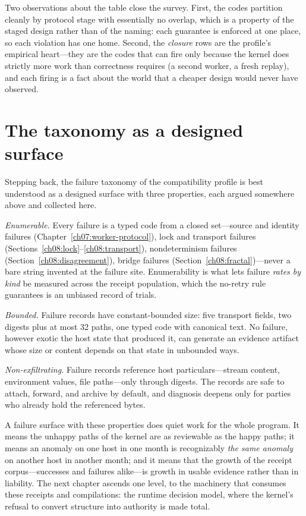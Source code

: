 Two observations about the table close the survey. First, the codes partition cleanly by protocol stage with essentially no overlap, which is a property of the staged design rather than of the naming: each guarantee is enforced at one place, so each violation has one home. Second, the \emph{closure} rows are the profile's empirical heart---they are the codes that can fire only because the kernel does strictly more work than correctness requires (a second worker, a fresh replay), and each firing is a fact about the world that a cheaper design would never have observed.

\section{The taxonomy as a designed surface}\label{ch08:taxonomy}

Stepping back, the failure taxonomy of the compatibility profile is best understood as a designed surface with three properties, each argued somewhere above and collected here.

\emph{Enumerable.} Every failure is a typed code from a closed set---source and identity failures (Chapter~\ref{ch07:worker-protocol}), lock and transport failures (Sections~\ref{ch08:lock}--\ref{ch08:transport}), nondeterminism failures (Section~\ref{ch08:disagreement}), bridge failures (Section~\ref{ch08:fractal})---never a bare string invented at the failure site. Enumerability is what lets failure \emph{rates by kind} be measured across the receipt population, which the no-retry rule guarantees is an unbiased record of trials.

\emph{Bounded.} Failure records have constant-bounded size: five transport fields, two digests plus at most 32 paths, one typed code with canonical text. No failure, however exotic the host state that produced it, can generate an evidence artifact whose size or content depends on that state in unbounded ways.

\emph{Non-exfiltrating.} Failure records reference host particulars---stream content, environment values, file paths---only through digests. The records are safe to attach, forward, and archive by default, and diagnosis deepens only for parties who already hold the referenced bytes.

A failure surface with these properties does quiet work for the whole program. It means the unhappy paths of the kernel are as reviewable as the happy paths; it means an anomaly on one host in one month is recognizably \emph{the same anomaly} on another host in another month; and it means that the growth of the receipt corpus---successes and failures alike---is growth in usable evidence rather than in liability. The next chapter ascends one level, to the machinery that consumes these receipts and compilations: the runtime decision model, where the kernel's refusal to convert structure into authority is made total.
